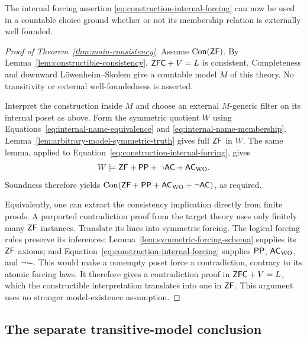 The internal forcing assertion
\eqref{eq:construction-internal-forcing} can now be used in a
countable choice ground whether or not its membership relation is
externally well founded.

\begin{proof}[Proof of Theorem~\ref{thm:main-consistency}]
Assume $\operatorname{Con}(\mathsf{ZF})$. By
Lemma~\ref{lem:constructible-consistency},
$\mathsf{ZFC}+V=L$ is consistent. Completeness and downward
L\"owenheim--Skolem give a countable model $M$ of this theory.
No transitivity or external well-foundedness is asserted.

Interpret the construction inside $M$ and choose an external
$M$-generic filter on its internal poset as above. Form the
symmetric quotient $W$ using
Equations~\eqref{eq:internal-name-equivalence} and
\eqref{eq:internal-name-membership}.
Lemma~\ref{lem:arbitrary-model-symmetric-truth} gives full $\mathsf{ZF}$
in $W$. The same lemma, applied to
Equation~\eqref{eq:construction-internal-forcing}, gives
\[
 W\models\mathsf{ZF}+\mathsf{PP}+\neg\mathsf{AC}+\mathsf{AC}_{\mathrm{WO}}.
\]
Soundness therefore yields
$\operatorname{Con}(\mathsf{ZF}+\mathsf{PP}+\mathsf{AC}_{\mathrm{WO}}+\neg\mathsf{AC})$, as required.

Equivalently, one can extract the consistency implication directly
from finite proofs. A purported contradiction proof from the
target theory uses only finitely many $\mathsf{ZF}$ instances.
Translate its lines into symmetric forcing. The logical forcing
rules preserve its inferences;
Lemma~\ref{lem:symmetric-forcing-schema} supplies its $\mathsf{ZF}$
axioms; and Equation~\eqref{eq:construction-internal-forcing}
supplies $\mathsf{PP}$, $\mathsf{AC}_{\mathrm{WO}}$, and $\neg\AC$. This would make a nonempty
poset force a contradiction, contrary to its atomic forcing laws.
It therefore gives a contradiction proof in $\mathsf{ZFC}+V=L$, which
the constructible interpretation translates into one in $\mathsf{ZF}$.
This argument uses no stronger model-existence assumption.
\end{proof}

\subsection{The separate transitive-model conclusion}

